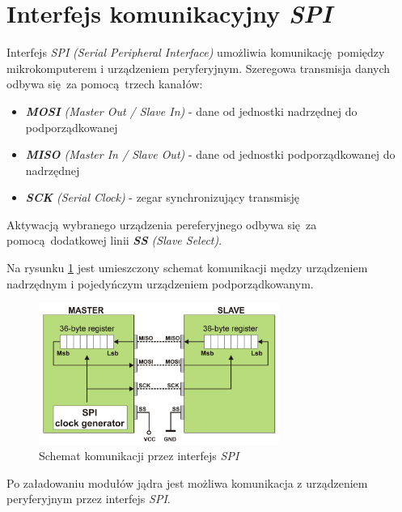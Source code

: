 \documentclass[eng,printmode]{mgr}
\begin{document}
\section{Interfejs komunikacyjny \emph{SPI}}

Interfejs \emph{SPI} \emph{(Serial Peripheral Interface)} umożliwia komunikację pomiędzy mikrokomputerem i urządzeniem peryferyjnym. Szeregowa transmisja danych odbywa się za pomocą trzech kanałów\cite{broadcom}:

\begin{itemize}
  \item{\emph{\textbf{MOSI} (Master Out / Slave In)} - dane od jednostki nadrzędnej do podporządkowanej}
  \item{\emph{\textbf{MISO} (Master In / Slave Out)} - dane od jednostki podporządkowanej do nadrzędnej}
  \item{\emph{\textbf{SCK} (Serial Clock)} - zegar synchronizujący transmisję}
\end{itemize}

Aktywacją wybranego urządzenia pereferyjnego odbywa się za pomocą dodatkowej linii \emph{\textbf{SS} (Slave Select)}.

Na rysunku \ref{spi} jest umieszczony schemat komunikacji mędzy urządzeniem nadrzędnym i pojedyńczym urządzeniem podporządkowanym.

\begin{figure}[!ht]
    \centering
    \includegraphics[width=0.7\textwidth]{Figures/spi3.png} 
    \caption{Schemat komunikacji przez interfejs \emph{SPI}}
    \label{spi}
\end{figure}

Po załadowaniu modułów jądra jest możliwa komunikacja z urządzeniem peryferyjnym przez interfejs \emph{SPI}.



\end{document}
